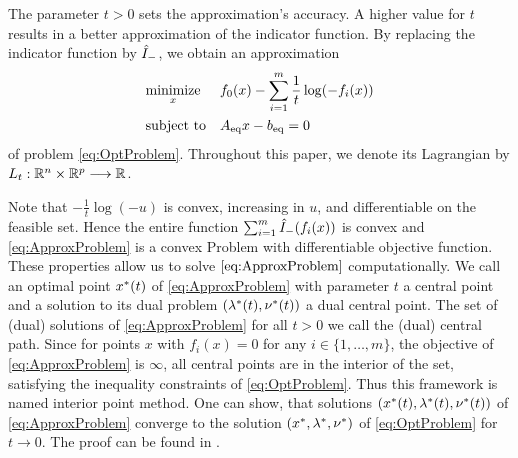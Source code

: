 The parameter $ t>0 $ sets the approximation's accuracy. A higher value for $ t $ results in a better approximation of the indicator function.
By replacing the indicator function by $ {\hat{I}}_{\mathrm{-}} $, we obtain an
approximation 
\begin{equation}
\begin{aligned}
& \underset{x}{\text{minimize}}
& & f_0(x) - \sum_{i=1}^{m} \frac{1}{t} \log(-f_i(x)) \\
& \text{subject to}
& & {A}_{\mathrm{eq}} x - {b}_{\mathrm{eq}} = 0
\end{aligned} \label{eq:ApproxProblem}
\end{equation}
of problem \eqref{eq:OptProblem}. Throughout this paper, we denote its  Lagrangian by $ L_t: \mathbb{R}^n \times \mathbb{R}^p \longrightarrow \mathbb{R} $.

Note that $ -\frac{1}{t}\log(-u) $ is convex, increasing in $ u $, and differentiable on the feasible set. Hence the entire function $ \sum_{i=1}^{m} {\hat{I}}_{\mathrm{-}}(f_i(x)) $ is convex and \eqref{eq:ApproxProblem} is a convex Problem with differentiable objective function. These properties allow us to solve $ \eqref{eq:ApproxProblem} $ computationally.
We call an optimal point $ x^*(t) $ of \eqref{eq:ApproxProblem} with parameter $ t $  a central point and a solution to its dual problem $ (\lambda^*(t),\nu^*(t)) $ a dual central point. The set of (dual) solutions of \eqref{eq:ApproxProblem} for all $ t>0 $ we call the (dual) central path. Since for points $ x $ with $ f_i(x) = 0 $ for any $ i \in \{1,\dots,m \} $, the objective of \eqref{eq:ApproxProblem} is $ \infty $, all central points are in the interior of the set, satisfying the inequality constraints of \eqref{eq:OptProblem}. Thus this framework is named interior point method. One can show, that solutions $ (x^*(t),\lambda^*(t),\nu^*(t)) $ of \eqref{eq:ApproxProblem} converge to the solution  $ (x^*,\lambda^*, \nu^*) $ of \eqref{eq:OptProblem} for $ t  \longrightarrow 0 $. The proof can be found in \cite{BV}.
\label{sec:BarrierConcept}

